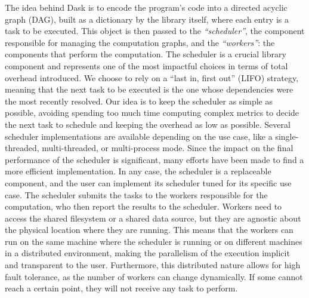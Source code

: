 The idea behind Dask is to encode the program's code into a directed acyclic
graph (DAG), built as a dictionary by the library itself, where each entry is a
task to be executed. This object is then passed to the \textit{``scheduler''},
the component responsible for managing the computation graphs, and the
\textit{``workers''}: the components that perform the computation. The scheduler
is a crucial library component and represents one of the most impactful choices
in terms of total overhead introduced. We choose to rely on a ``last in, first
out'' (LIFO) strategy, meaning that the next task to be executed is the one
whose dependencies were the most recently resolved. Our idea is to keep the
scheduler as simple as possible, avoiding spending too much time computing
complex metrics to decide the next task to schedule and keeping the overhead as
low as possible. Several scheduler implementations are available depending on
the use case, like a single-threaded, multi-threaded, or multi-process mode.
Since the impact on the final performance of the scheduler is significant, many
efforts have been made to find a more efficient implementation\cite{bohm2020}.
In any case, the scheduler is a replaceable component, and the user can
implement its scheduler tuned for its specific use case. The scheduler submits
the tasks to the workers responsible for the computation, who then report the
results to the scheduler.  Workers need to access the shared filesystem or a
shared data source, but they are agnostic about the physical location where they
are running. This means that the workers can run on the same machine where the
scheduler is running or on different machines in a distributed environment,
making the parallelism of the execution implicit and transparent to the user.
Furthermore, this distributed nature allows for high fault tolerance, as the
number of workers can change dynamically. If some cannot reach a certain point,
they will not receive any task to perform. 


